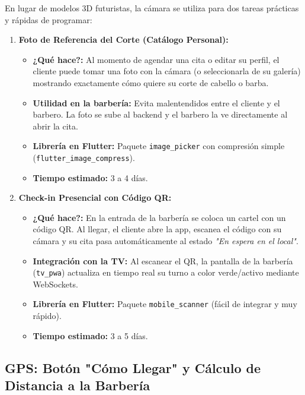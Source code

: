 \documentclass[11pt,a4paper]{article}
\begin{document}
En lugar de modelos 3D futuristas, la cámara se utiliza para dos tareas prácticas y rápidas de programar:

\begin{enumerate}
    \item \textbf{Foto de Referencia del Corte (Catálogo Personal):}
    \begin{itemize}
        \item \textbf{¿Qué hace?:} Al momento de agendar una cita o editar su perfil, el cliente puede tomar una foto con la cámara (o seleccionarla de su galería) mostrando exactamente cómo quiere su corte de cabello o barba.
        \item \textbf{Utilidad en la barbería:} Evita malentendidos entre el cliente y el barbero. La foto se sube al backend y el barbero la ve directamente al abrir la cita.
        \item \textbf{Librería en Flutter:} Paquete \texttt{image\_picker} con compresión simple (\texttt{flutter\_image\_compress}).
        \item \textbf{Tiempo estimado:} 3 a 4 días.
    \end{itemize}

    \item \textbf{Check-in Presencial con Código QR:}
    \begin{itemize}
        \item \textbf{¿Qué hace?:} En la entrada de la barbería se coloca un cartel con un código QR. Al llegar, el cliente abre la app, escanea el código con su cámara y su cita pasa automáticamente al estado \textit{"En espera en el local"}.
        \item \textbf{Integración con la TV:} Al escanear el QR, la pantalla de la barbería (\texttt{tv\_pwa}) actualiza en tiempo real su turno a color verde/activo mediante WebSockets.
        \item \textbf{Librería en Flutter:} Paquete \texttt{mobile\_scanner} (fácil de integrar y muy rápido).
        \item \textbf{Tiempo estimado:} 3 a 5 días.
    \end{itemize}
\end{enumerate}

\subsection{GPS: Botón "Cómo Llegar" y Cálculo de Distancia a la Barbería}
\end{document}

